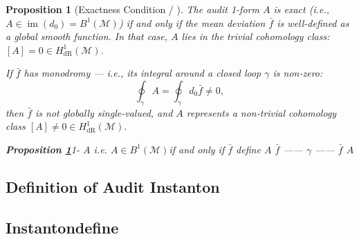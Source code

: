 \documentclass[11pt,a4paper]{article}
\theoremstyle{plain}
\newtheorem{proposition}[theorem]{Proposition}
\theoremstyle{definition}
\DeclareMathOperator{\im}{im}
\newcommand{\cM}{\mathcal{M}}
\begin{document}
\begin{proposition}[Exactness Condition / ]
\label{prop:exactness}
The audit 1-form $A$ is \emph{exact} (i.e., $A \in \im(d_0) = B^1(\cM)$) 
if and only if the mean deviation $\bar{f}$ is well-defined as a global 
smooth function. In that case, $A$ lies in the trivial cohomology class: 
$[A] = 0 \in H^1_{\text{dR}}(\cM)$.

If $\bar{f}$ has \emph{monodromy} — i.e., its integral around a closed loop 
$\gamma$ is non-zero:
\begin{equation}
  \oint_{\gamma} A = \oint_{\gamma} d_0 \bar{f} \neq 0,
  \label{eq:monodromy}
\end{equation}
then $\bar{f}$ is not globally single-valued, and $A$ represents a 
\emph{non-trivial} cohomology class $[A] \neq 0 \in H^1_{\text{dR}}(\cM)$.
\end{proposition}

\bigskip
\noindent
\textit{\textbf{Proposition \ref{prop:exactness}}1- $A$ \textbf{}i.e. $A \in B^1(\cM)$if and only if $\bar{f}$ define $A$  $\bar{f}$ \textbf{}—— $\gamma$ —— $\bar{f}$ $A$ \textbf{}}

\subsection{Definition of Audit Instanton}
\subsection*{Instantondefine}
\end{document}
